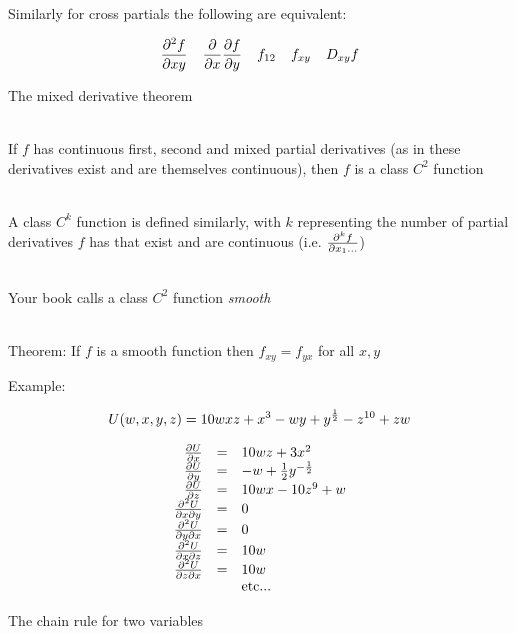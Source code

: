 \documentclass[10pt]{seminar}
\begin{document}
\begin{slide}
\ \\Similarly for cross partials the following are equivalent:

$${{\partial^2 f}\over{\partial xy}} \hspace{.15in} {{\partial }\over{\partial x}} {{\partial f}\over {\partial y}} \hspace{.15in} f_{12}  \hspace{.15in} f_{xy} \hspace{.15in} D_{xy} f$$


\newslide

The mixed derivative theorem

\ \\If $f$ has continuous first, second and mixed partial derivatives (as in these derivatives exist and are themselves continuous), then $f$ is a class $C^2$ function

\ \\A class $C^k$ function is defined similarly, with $k$ representing the number of partial derivatives $f$ has that exist and are continuous (i.e. $ {{\partial^k f}\over{\partial x_1...}}$)

\ \\Your book calls a class $C^2$ function \textit{smooth}

\ \\Theorem: If $f$ is a smooth function then $f_{xy}=f_{yx}$ for all $x, y$

\newslide

Example:

$$U(w, x, y, z)=10wxz+x^3-wy+y^{1\over 2}-z^{10}+zw$$ 

$$\begin{array}{rcl}
{{\partial U}\over{\partial x}} & = & 10wz+3x^2\\
{{\partial U}\over{\partial y}} &=& -w+{1\over 2}y^{-{1\over 2}}\\
 {{\partial U}\over{\partial z}} &=&10wx-10z^9+w \\
  {{\partial^2 U}\over{\partial x \partial y}} &=& 0\\
  {{\partial^2 U}\over{\partial y \partial x}} &=&0\\
    {{\partial^2 U}\over{\partial x \partial z}} &=& 10w\\
    {{\partial^2 U}\over{\partial z \partial x}} &=& 10w\\
&&\hbox{etc...} 
\end{array}
$$

\newslide

The chain rule for two variables


\end{slide}
\end{document}
